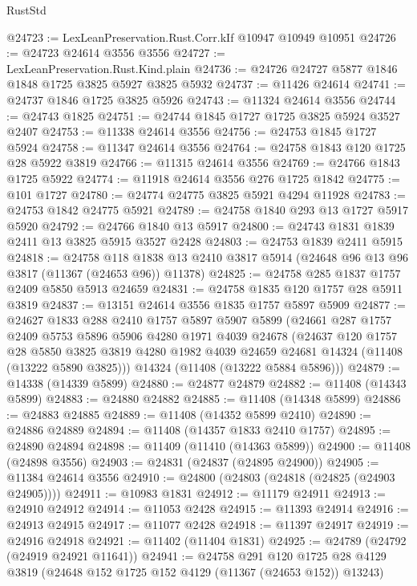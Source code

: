 \begin{lexlean}{RustStd}
\begin{coremodule}
@24723 := LexLeanPreservation.Rust.Corr.kIf @10947 @10949 @10951
@24726 := @24723 @24614 @3556 @3556
@24727 := LexLeanPreservation.Rust.Kind.plain
@24736 := @24726 @24727 @5877 @1846 @1848 @1725 @3825 @5927 @3825 @5932
@24737 := @11426 @24614
@24741 := @24737 @1846 @1725 @3825 @5926
@24743 := @11324 @24614 @3556
@24744 := @24743 @1825
@24751 := @24744 @1845 @1727 @1725 @3825 @5924 @3527 @2407
@24753 := @11338 @24614 @3556
@24756 := @24753 @1845 @1727 @5924
@24758 := @11347 @24614 @3556
@24764 := @24758 @1843 @120 @1725 @28 @5922 @3819
@24766 := @11315 @24614 @3556
@24769 := @24766 @1843 @1725 @5922
@24774 := @11918 @24614 @3556 @276 @1725 @1842
@24775 := @101 @1727
@24780 := @24774 @24775 @3825 @5921 @4294 @11928
@24783 := @24753 @1842 @24775 @5921
@24789 := @24758 @1840 @293 @13 @1727 @5917 @5920
@24792 := @24766 @1840 @13 @5917
@24800 := @24743 @1831 @1839 @2411 @13 @3825 @5915 @3527 @2428
@24803 := @24753 @1839 @2411 @5915
@24818 := @24758
    @118
    @1838
    @13
    @2410
    @3817
    @5914
    (@24648 @96 @13 @96 @3817 (@11367 (@24653 @96)) @11378)
@24825 := @24758 @285 @1837 @1757 @2409 @5850 @5913 @24659
@24831 := @24758 @1835 @120 @1757 @28 @5911 @3819
@24837 := @13151 @24614 @3556 @1835 @1757 @5897 @5909
@24877 := @24627
    @1833
    @288
    @2410
    @1757
    @5897
    @5907
    @5899
    (@24661
      @287
      @1757
      @2409
      @5753
      @5896
      @5906
      @4280
      @1971
      @4039
      @24678
      (@24637
        @120
        @1757
        @28
        @5850
        @3825
        @3819
        @4280
        @1982
        @4039
        @24659
        @24681
        @14324
        (@11408 (@13222 @5890 @3825)))
      @14324
      (@11408 (@13222 @5884 @5896)))
@24879 := @14338 (@14339 @5899)
@24880 := @24877 @24879
@24882 := @11408 (@14343 @5899)
@24883 := @24880 @24882
@24885 := @11408 (@14348 @5899)
@24886 := @24883 @24885
@24889 := @11408 (@14352 @5899 @2410)
@24890 := @24886 @24889
@24894 := @11408 (@14357 @1833 @2410 @1757)
@24895 := @24890 @24894
@24898 := @11409 (@11410 (@14363 @5899))
@24900 := @11408 (@24898 @3556)
@24903 := @24831 (@24837 (@24895 @24900))
@24905 := @11384 @24614 @3556
@24910 := @24800 (@24803 (@24818 (@24825 (@24903 @24905))))
@24911 := @10983 @1831
@24912 := @11179 @24911
@24913 := @24910 @24912
@24914 := @11053 @2428
@24915 := @11393 @24914
@24916 := @24913 @24915
@24917 := @11077 @2428
@24918 := @11397 @24917
@24919 := @24916 @24918
@24921 := @11402 (@11404 @1831)
@24925 := @24789 (@24792 (@24919 @24921 @11641))
@24941 := @24758
    @291
    @120
    @1725
    @28
    @4129
    @3819
    (@24648 @152 @1725 @152 @4129 (@11367 (@24653 @152)) @13243)

\end{coremodule}
\end{lexlean}

